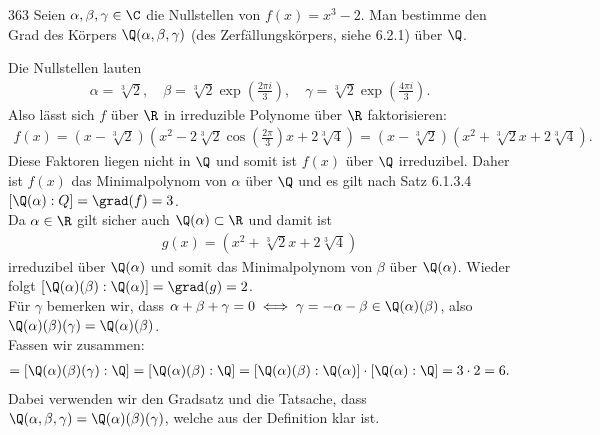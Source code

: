 \begin{algebraUE}{363}
  Seien $\alpha, \beta, \gamma \in \C$ die Nullstellen von $f(x) = x^3 - 2.$ Man bestimme den Grad des Körpers $\Q(\alpha, \beta, \gamma)$ (des Zerfällungskörpers, siehe 6.2.1) über $\Q$.
\end{algebraUE}

\begin{solution}
Die Nullstellen lauten
\begin{align*}
  \alpha = \sqrt[3]{2}, \quad \beta = \sqrt[3]{2}\exp\left(\frac{2\pi i}{3}\right), \quad \gamma = \sqrt[3]{2}\exp\left(\frac{4\pi i}{3}\right).
\end{align*}
Also lässt sich $f$ über $\R$ in irreduzible Polynome über $\R$ faktorisieren:
\begin{align*}
  f(x) = \left(x - \sqrt[3]{2}\right)\left(x^2 - 2\sqrt[3]{2}\cos\left(\frac{2\pi}{3}\right) x +
  2\sqrt[3]{4}\right) = \left(x - \sqrt[3]{2}\right)\left(x^2 + \sqrt[3]{2} x + 2\sqrt[3]{4}\right).
\end{align*}
Diese Faktoren liegen nicht in $\Q$ und somit ist $f(x)$ über $\Q$ irreduzibel.
Daher ist $f(x)$ das Minimalpolynom von $\alpha$ über $\Q$ und es gilt nach Satz 6.1.3.4
$[\Q(\alpha): Q] = \grad(f) = 3$. \\
Da $\alpha \in \R$ gilt sicher auch $\Q(\alpha) \subset \R$ und damit ist
\begin{align*}
  g(x) = \left(x^2 + \sqrt[3]{2} x + 2\sqrt[3]{4}\right)
\end{align*}
irreduzibel über $\Q(\alpha)$ und somit das Minimalpolynom von $\beta$ über $\Q(\alpha)$.
Wieder folgt $[\Q(\alpha)(\beta): \Q(\alpha)] = \grad(g) = 2$. \\
Für $\gamma$ bemerken wir, dass $\alpha + \beta + \gamma = 0 \iff \gamma = -\alpha - \beta \in \Q(\alpha)(\beta)$,
also $\Q(\alpha)(\beta)(\gamma) = \Q(\alpha)(\beta)$. \\
Fassen wir zusammen:
\begin{align*}
  [\Q(\alpha,\beta,\gamma): \Q] =  [\Q(\alpha)(\beta)(\gamma): \Q]
  = [\Q(\alpha)(\beta): \Q] = [\Q(\alpha)(\beta): \Q(\alpha)]\cdot[\Q(\alpha): \Q] = 3\cdot2= 6.
\end{align*}
Dabei verwenden wir den Gradsatz und die Tatsache, dass $\Q(\alpha,\beta,\gamma) = \Q(\alpha)(\beta)(\gamma)$,
welche aus der Definition klar ist.
\end{solution}
